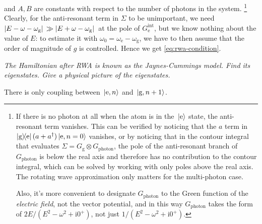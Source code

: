 \documentclass[hyperref, a4paper]{article}
\newcommand*{\ii}{\mathrm{i}}
\newcommand*{\omegae}{\omega_{\text{e}}}
\newcommand*{\omegag}{\omega_{\text{g}}}
\newcommand*{\kete}{\ket*{\text{e}}}
\newcommand*{\dyadge}{\dyad{\text{g}}{\text{e}}}
\begin{document}
and $A, B$ are constants with respect to the number of photons in the system.%
\footnote{
    If there is no photon at all when the atom is in the $\kete$ state,
    the anti-resonant term vanishes.
    This can be verified by noticing that the $a$ term in $\dyadge (a + a^\dag) \ket*{\text{e}, n=0}$ vanishes,
    or by noticing that in the contour integral that evaluates $\Sigma = G_{\text{g}} \otimes G_{\text{photon}}$,
    the pole of the anti-resonant branch of $G_{\text{photon}}$ is below the real axis 
    and therefore has no contribution to the contour integral, 
    which can be solved by working with only poles above the real axis.
    The rotating wave approximation only matters for the multi-photon case.
    
    Also, it's more convenient to designate $G_{\text{photon}}$ to the Green function of the \emph{electric field},
    not the vector potential, and in this way $G_{\text{photon}}$ takes the form of $2 E / (E^2 - \omega^2 + \ii 0^+)$, not just $1/(E^2 - \omega^2 + \ii 0^+)$.
}
Clearly, for the anti-resonant term in $\Sigma$ to be unimportant, we need 
$\abs*{E - \omega - \omegag} \gg \abs*{E + \omega - \omegag}$ at the pole of $G^{\text{int}}_{\text{e}}$,
but we know nothing about the value of $E$:
to estimate it with $\omega_0 = \omegae - \omegag$,
we have to then assume that the order of magnitude of $g$ is controlled.
Hence we get \eqref{eq:rwa-condition}.

\textit{The Hamiltonian after RWA is known as the Jaynes-Cummings model. 
Find its eigenstates. Give a physical picture of the eigenstates.}

There is only coupling between $\ket*{\text{e}, n}$ and $\ket*{\text{g}, n+1}$.
\end{document}
